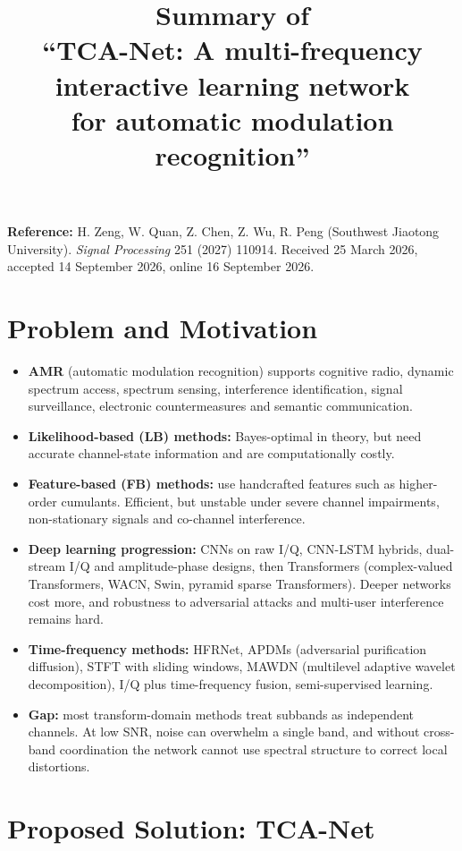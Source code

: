 \documentclass[11pt,a4paper]{article}
\title{Summary of\\ ``TCA-Net: A multi-frequency interactive learning network\\ for automatic modulation recognition''}
\author{}
\date{}
\begin{document}
\maketitle

\noindent\textbf{Reference:} H. Zeng, W. Quan, Z. Chen, Z. Wu, R. Peng (Southwest Jiaotong University). \emph{Signal Processing} 251 (2027) 110914. Received 25 March 2026, accepted 14 September 2026, online 16 September 2026.

\section{Problem and Motivation}

\begin{itemize}
  \item \textbf{AMR} (automatic modulation recognition) supports cognitive radio, dynamic spectrum access, spectrum sensing, interference identification, signal surveillance, electronic countermeasures and semantic communication.
  \item \textbf{Likelihood-based (LB) methods:} Bayes-optimal in theory, but need accurate channel-state information and are computationally costly.
  \item \textbf{Feature-based (FB) methods:} use handcrafted features such as higher-order cumulants. Efficient, but unstable under severe channel impairments, non-stationary signals and co-channel interference.
  \item \textbf{Deep learning progression:} CNNs on raw I/Q, CNN-LSTM hybrids, dual-stream I/Q and amplitude-phase designs, then Transformers (complex-valued Transformers, WACN, Swin, pyramid sparse Transformers). Deeper networks cost more, and robustness to adversarial attacks and multi-user interference remains hard.
  \item \textbf{Time-frequency methods:} HFRNet, APDMs (adversarial purification diffusion), STFT with sliding windows, MAWDN (multilevel adaptive wavelet decomposition), I/Q plus time-frequency fusion, semi-supervised learning.
  \item \textbf{Gap:} most transform-domain methods treat subbands as independent channels. At low SNR, noise can overwhelm a single band, and without cross-band coordination the network cannot use spectral structure to correct local distortions.
\end{itemize}

\section{Proposed Solution: TCA-Net}
\end{document}
